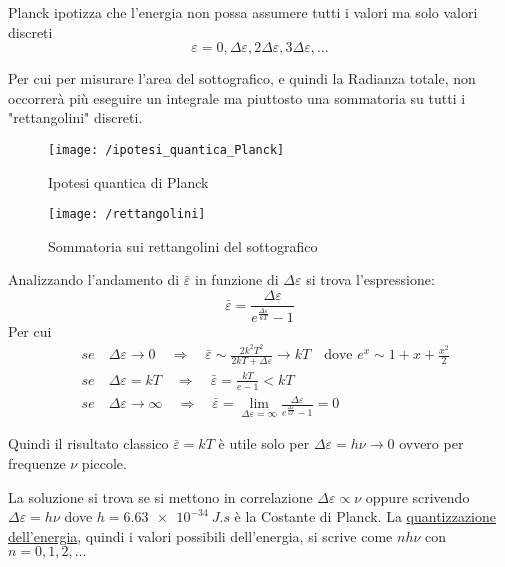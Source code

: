 Planck ipotizza che l'energia non possa assumere tutti i valori ma solo valori discreti
$$\varepsilon = 0,\Delta\varepsilon,2\Delta\varepsilon,3\Delta\varepsilon, ...$$

Per cui per misurare l'area del sottografico, e quindi la Radianza totale, non occorrerà più eseguire un integrale ma piuttosto una sommatoria su tutti i "rettangolini" discreti.

\begin{figure}[h]
\centering
\texttt{[image: /ipotesi\_quantica\_Planck]}
\caption{Ipotesi quantica di Planck}
\end{figure}

\begin{figure}[h]
\centering
\texttt{[image: /rettangolini]}
\caption{Sommatoria sui rettangolini del sottografico}
\end{figure}

Analizzando l'andamento di $\bar\varepsilon$ in funzione di $\Delta\varepsilon$ si trova l'espressione:
\begin{equation}
\bar\varepsilon = \frac{ \Delta\varepsilon}{e^{ \frac{ \Delta\varepsilon}{kT } } - 1 }
\end{equation}
Per cui
\begin{equation}
\begin{split}
& se \quad \Delta\varepsilon \rightarrow 0 \quad \Rightarrow \quad \bar\varepsilon \sim \frac{ 2 k^2 T^2 }{2kT + \Delta\varepsilon } \rightarrow kT  \quad \mbox{dove } e^x \sim 1 + x + \frac{ x^2}{2 } \\
& se \quad \Delta\varepsilon = kT \quad \Rightarrow \quad \bar\varepsilon = \frac{ kT }{ e - 1 } < kT \\
& se \quad \Delta\varepsilon \rightarrow \infty \quad \Rightarrow \quad \bar\varepsilon = \lim_{\Delta\varepsilon = \infty}  \frac{ \Delta\varepsilon}{e^{ \frac{ \Delta\varepsilon}{kT } } - 1 } = 0
\end{split}
\end{equation}

Quindi il risultato classico $\bar\varepsilon = kT$ è utile solo per $\Delta\varepsilon = h\nu \rightarrow 0$ ovvero per frequenze $\nu$ piccole.

La soluzione si trova se si mettono in correlazione $\Delta\varepsilon \propto \nu$ oppure scrivendo $\Delta\varepsilon = h\nu$ dove $h=\SI{6.63e-34}{J.s}$ è la Costante di Planck.
La \underline{quantizzazione dell'energia}, quindi i valori possibili dell'energia, si scrive come $n h \nu$ con $n = 0,1,2, ...$

